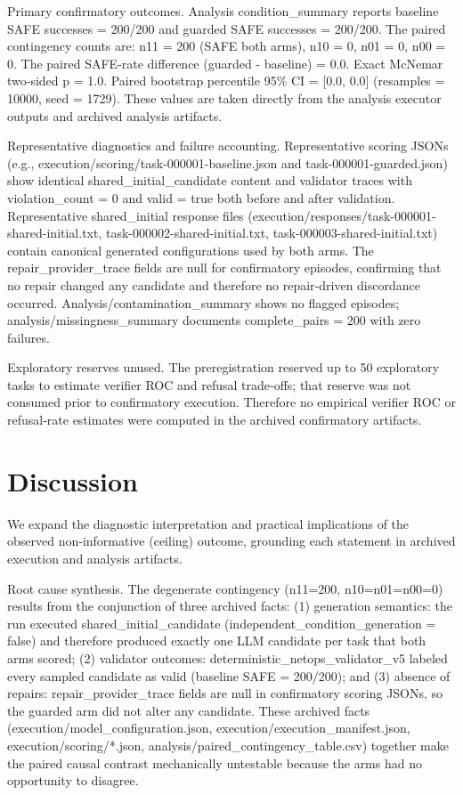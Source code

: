 \documentclass[conference]{IEEEtran}
\begin{document}
Primary confirmatory outcomes. Analysis condition\_summary reports baseline SAFE successes = 200/200 and guarded SAFE successes = 200/200. The paired contingency counts are: n11 = 200 (SAFE both arms), n10 = 0, n01 = 0, n00 = 0. The paired SAFE‑rate difference (guarded - baseline) = 0.0. Exact McNemar two‑sided p = 1.0. Paired bootstrap percentile 95\% CI = [0.0, 0.0] (resamples = 10000, seed = 1729). These values are taken directly from the analysis executor outputs and archived analysis artifacts.

Representative diagnostics and failure accounting. Representative scoring JSONs (e.g., execution/scoring/task-000001-baseline.json and task-000001-guarded.json) show identical shared\_initial\_candidate content and validator traces with violation\_count = 0 and valid = true both before and after validation. Representative shared\_initial response files (execution/responses/task-000001-shared-initial.txt, task-000002-shared-initial.txt, task-000003-shared-initial.txt) contain canonical generated configurations used by both arms. The repair\_provider\_trace fields are null for confirmatory episodes, confirming that no repair changed any candidate and therefore no repair‑driven discordance occurred. Analysis/contamination\_summary shows no flagged episodes; analysis/missingness\_summary documents complete\_pairs = 200 with zero failures.

Exploratory reserves unused. The preregistration reserved up to 50 exploratory tasks to estimate verifier ROC and refusal trade‑offs; that reserve was not consumed prior to confirmatory execution. Therefore no empirical verifier ROC or refusal‑rate estimates were computed in the archived confirmatory artifacts.

\section{Discussion}
We expand the diagnostic interpretation and practical implications of the observed non‑informative (ceiling) outcome, grounding each statement in archived execution and analysis artifacts.

Root cause synthesis. The degenerate contingency (n11=200, n10=n01=n00=0) results from the conjunction of three archived facts: (1) generation semantics: the run executed shared\_initial\_candidate (independent\_condition\_generation = false) and therefore produced exactly one LLM candidate per task that both arms scored; (2) validator outcomes: deterministic\_netops\_validator\_v5 labeled every sampled candidate as valid (baseline SAFE = 200/200); and (3) absence of repairs: repair\_provider\_trace fields are null in confirmatory scoring JSONs, so the guarded arm did not alter any candidate. These archived facts (execution/model\_configuration.json, execution/execution\_manifest.json, execution/scoring/*.json, analysis/paired\_contingency\_table.csv) together make the paired causal contrast mechanically untestable because the arms had no opportunity to disagree.
\end{document}
